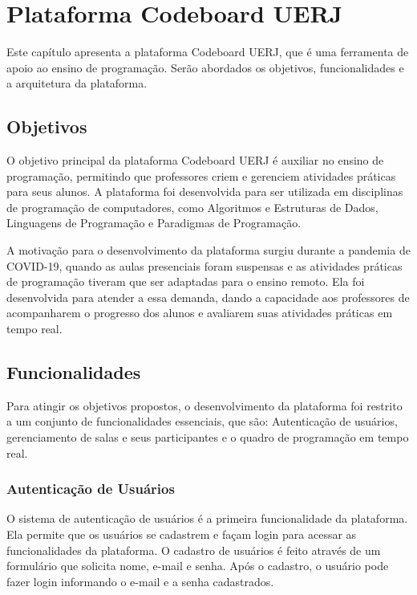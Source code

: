 \section{Plataforma Codeboard UERJ}

Este capítulo apresenta a plataforma Codeboard UERJ, que é uma ferramenta de apoio ao ensino de programação. Serão abordados os objetivos, funcionalidades e a arquitetura da plataforma.	


\subsection{Objetivos}

O objetivo principal da plataforma Codeboard UERJ é auxiliar no ensino de programação, permitindo que professores criem e gerenciem atividades práticas para seus alunos. A plataforma foi desenvolvida para ser utilizada em disciplinas de programação de computadores, como Algoritmos e Estruturas de Dados, Linguagens de Programação e Paradigmas de Programação.

A motivação para o desenvolvimento da plataforma surgiu durante a pandemia de COVID-19, quando as aulas presenciais foram suspensas e as atividades práticas de programação tiveram que ser adaptadas para o ensino remoto. Ela foi desenvolvida para atender a essa demanda, dando a capacidade aos professores de acompanharem o progresso dos alunos e avaliarem suas atividades práticas em tempo real.

\subsection{Funcionalidades}

Para atingir os objetivos propostos, o desenvolvimento da plataforma foi restrito a um conjunto de funcionalidades essenciais, que são:
Autenticação de usuários, gerenciamento de salas e seus participantes e o quadro de programação em tempo real.

\subsubsection{Autenticação de Usuários}

O sistema de autenticação de usuários é a primeira funcionalidade da plataforma. Ela permite que os usuários se cadastrem e façam login para acessar as funcionalidades da plataforma. O cadastro de usuários é feito através de um formulário que solicita nome, e-mail e senha. Após o cadastro, o usuário pode fazer login informando o e-mail e a senha cadastrados.

